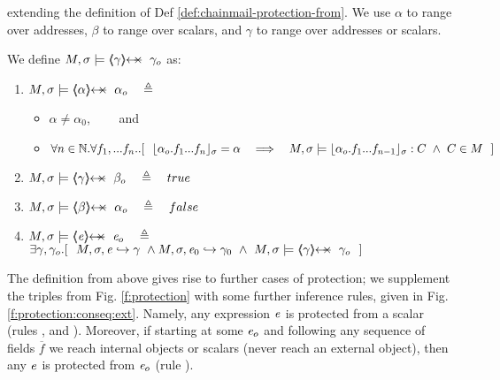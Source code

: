 \begin{definition}
\label{def:chainmail-protection-from-ext}
extending the definition of Def 
\ref{def:chainmail-protection-from}. We use $\alpha$ to range over addresses, $\beta$  to range over scalars, and   $\gamma$ to range over addresses or scalars.

\noindent
We define  $\satisfiesA{M}{\sigma}{\protectedFrom{{\gamma}} {{\gamma_{o}}}} $ as:
\begin{enumerate}
\item
\label{cProtectedNew}
 $\satisfiesA{M}{\sigma}{\protectedFrom{{\alpha}} {{\alpha_{o}}}}   \ \ \ \triangleq $ 
  \begin{itemize}
 \item
$\alpha\neq \alpha_0$,
 \ \ \ \  and%
 \item
$\forall n\in\mathbb{N}. \forall f_1,...f_n..
[\ \ \interpret{\sigma}{\alpha_{o}.f_1...f_n}=\alpha \ \ \  \Longrightarrow \ \ \  \satisfiesA{M}{\sigma}{ {\interpret{\sigma}{\alpha_{o}.f_1...f_{n-1}}}:C} \ \wedge \ C\in M\ \ ]$
\end{itemize}
\item
 $\satisfiesA{M}{\sigma}{\protectedFrom{{\gamma}} {{\beta_{o}}}}   \ \ \ \triangleq  \ \ \ true$
 \item
 $\satisfiesA{M}{\sigma}{\protectedFrom{{\beta}} {{\alpha_{o}}}}   \ \ \ \triangleq  \ \ \ false$
  \item
$\satisfiesA{M}{\sigma}{\protectedFrom{{\re}} {{\re_{o}}}} \ \ \ \triangleq $ \\
  $\exists \gamma, \gamma_{o}. [\  \ \eval{M}{\sigma}{{\re}}{\gamma}\ \wedge \eval{M}{\sigma}{{\re_0}}{\gamma_0} \  \wedge \ 
  \satisfiesA{M}{\sigma}{\protectedFrom{{\gamma}} {{\gamma_{o}}}}
 \ \  ]$
 \end{enumerate}
 \end{definition} 



{The definition from above gives rise to further cases of  protection; we supplement the triples from 
Fig. \ref{f:protection} with some further inference rules, given   in Fig. \ref{f:protection:conseq:ext}.}
Namely, any expression $\mathit{e}$ is protected from a scalar (rules {\sc{Prot-In}}, {\sc{Prot-Bool}} and {}).
Moreover, if starting at some $\mathit{e}_o$ and following any   sequence of fields $\overline f$ we reach   internal objects or  scalars (\ie never reach an external object), then any $\mathit{e}$ is protected from $\mathit{e}_o$ (rule {}).


